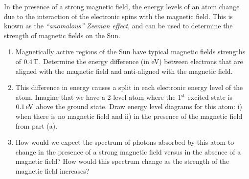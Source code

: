 %

\begin{problem}
In the presence of a strong magnetic field, the energy levels of an
atom change due to the interaction of the electronic spins with the
magnetic field.  This is known as the \emph{``anomalous'' Zeeman effect},
and can be used to determine the strength of magnetic fields on the Sun.
\begin{enumerate}
\item Magnetically active regions of the Sun have typical magnetic
fields strengths of $0.4 \,\mbox{T}$.  Determine the energy difference
(in eV) between electrons that are aligned with the magnetic field and
anti-aligned with the magnetic field.
\item This difference in energy causes a split in each electronic energy
level of the atom.  Imagine that we have a 2-level atom where the 1$^\text{st}$
excited state is $0.1 \,\mbox{eV}$ above the ground state.  Draw energy
level diagrams for this atom: i) when there is no magnetic field and ii)
in the presence of the magnetic field from part (a).
\item How would we expect the spectrum of photons absorbed by this atom to
change in the presence of a strong magnetic field versus in the absence
of a magnetic field?  How would this spectrum change as the strength of
the magnetic field increases?
\end{enumerate}
\label{prob:H_zeeman}
\end{problem}

